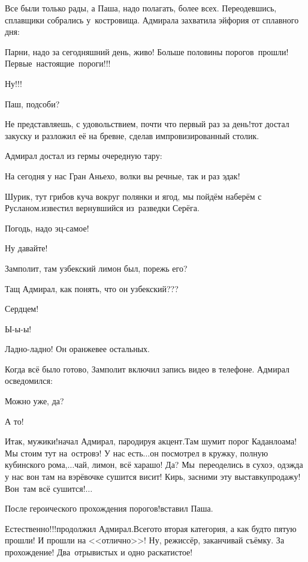 Все были только рады, а Паша, надо полагать, более всех. Переодевшись, сплавщики собрались у~костровища. Адмирала захватила эйфория от сплавного дня:

\diagdash Парни, надо за сегодняшний день, живо! Больше половины порогов~прошли! Первые~настоящие~пороги!!!%

\diagdash Ну!!!

\diagdash Паш, подсоби?

\diagdash Не представляешь, с удовольствием, почти что первый раз за день!\mdash тот достал закуску и разложил её на бревне, сделав импровизированный столик.

Адмирал достал из гермы очередную тару:

\diagdash На сегодня у нас Гран Аньехо, волки вы речные, так и раз эдак!

\diagdash Шурик, тут грибов куча вокруг полянки и ягод, мы пойдём наберём с Русланом.\mdash известил вернувшийся из~разведки Серёга.

\diagdash Погодь, надо эц-самое!

\diagdash Ну давайте!

\diagdash Замполит, там узбекский лимон был, порежь его?

\diagdash Тащ Адмирал, как понять, что он узбекский???

\diagdash Сердцем!

\diagdash Ы-ы-ы!

\diagdash Ладно-ладно! Он оранжевее остальных.

Когда всё было готово, Замполит включил запись видео в телефоне. Адмирал осведомился:

\diagdash Можно уже, да?

\diagdash А то!

\diagdash Итак, мужики!\mdash начал Адмирал, пародируя акцент.\mdash Там шумит порог Каданлоама! Мы стоим тут на~островэ! У нас есть$\ldots$\mdash он посмотрел в кружку, полную кубинского рома,\mdash $\ldots$чай, лимон, всё харашо! Да? Мы~переоделись в сухоэ, одэжда у нас вон там на вэрёвочке сушится висит! Кирь, засними эту выставку\sdash продажу! Вон~там всё сушится!$\ldots$

\diagdash После героического прохождения порогов!\mdash вставил Паша.

\diagdash Естественно!!!\mdash продолжил Адмирал.\mdash Всего\sdash то вторая категория, а как будто пятую прошли! И прошли на <<отлично>>! Ну, режиссёр, заканчивай съёмку. За прохождение! Два~отрывистых и одно раскатистое!


